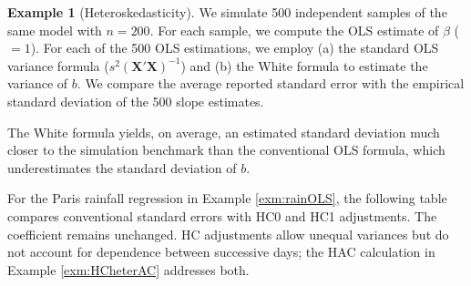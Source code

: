 \documentclass[
  11pt,
]{book}
\theoremstyle{definition}
\theoremstyle{definition}
\newtheorem{example}{Example}[chapter]
\theoremstyle{definition}
\theoremstyle{definition}
\theoremstyle{remark}
\begin{document}
\begin{example}[Heteroskedasticity]
We simulate 500 independent samples of the same model with \(n=200\). For each sample, we compute the OLS estimate of \(\beta\) (\(=1\)). For each of the 500 OLS estimations, we employ (a) the standard OLS variance formula (\(s^2 (\mathbf{X}'\mathbf{X})^{-1}\)) and (b) the White formula to estimate the variance of \(b\). We compare the average reported standard error with the empirical standard deviation of the 500 slope estimates.

\begin{table}[H]
\centering\begingroup\fontsize{10}{12}\selectfont

\endgroup{}
\end{table}

The White formula yields, on average, an estimated standard deviation much closer to the simulation benchmark than the conventional OLS formula, which underestimates the standard deviation of \(b\).
\end{example}

For the Paris rainfall regression in Example \ref{exm:rainOLS}, the following table compares conventional standard errors with HC0 and HC1 adjustments. The coefficient remains unchanged. HC adjustments allow unequal variances but do not account for dependence between successive days; the HAC calculation in Example \ref{exm:HCheterAC} addresses both.

\begin{table}[H]
\centering\begingroup\fontsize{10}{12}\selectfont

\endgroup{}
\end{table}
\end{document}
